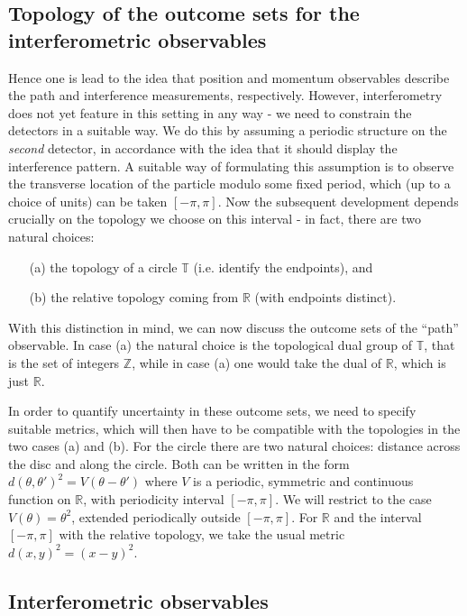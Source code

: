 \subsection{Topology of the outcome sets for the interferometric observables}

Hence one is lead to the idea that position and momentum observables describe the path and interference measurements, respectively. However, interferometry does not yet feature in this setting in any way - we need to constrain the detectors in a suitable way. We do this by assuming a periodic structure on the \emph{second} detector, in accordance with the idea that it should display the interference pattern. A suitable way of formulating this assumption is to observe the transverse location of the particle modulo some fixed period, which (up to a choice of units) can be taken $[-\pi,\pi]$. Now the subsequent development depends crucially on the topology we choose on this interval - in fact, there are two natural choices:
\begin{itemize}
\item[(a)] the topology of a circle $\mathbb T$ (i.e. identify the endpoints), and
\item[(b)] the relative topology coming from $\mathbb R$ (with endpoints distinct).
\end{itemize}
With this distinction in mind, we can now discuss the outcome sets of the ``path'' observable. In case (a) the natural choice is the topological dual group of $\mathbb T$, that is the set of integers $\mathbb Z$, while in case (a) one would take the dual of $\mathbb R$, which is just $\mathbb R$.

In order to quantify uncertainty in these outcome sets, we need to specify suitable metrics, which will then have to be compatible with the topologies in the two cases (a) and (b). For the circle there are two natural choices: distance across the disc and along the circle. Both can be written in the form $d(\theta,\theta')^2 = V(\theta-\theta')$ where $V$ is a periodic, symmetric and continuous function on $\mathbb R$, with periodicity interval $[-\pi,\pi]$. We will restrict to the case $V(\theta) = \theta^2$, extended periodically outside $[-\pi,\pi]$. For $\mathbb R$ and the interval $[-\pi,\pi]$ with the relative topology, we take the usual metric $d(x,y)^2=(x-y)^2$.

\subsection{Interferometric observables}

